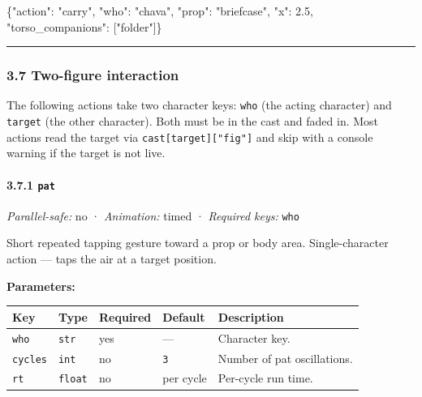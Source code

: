 \documentclass[
  12pt,
  letterpaper,
]{book}
\newenvironment{Shaded}{}{}
\newcommand{\DataTypeTok}[1]{\textcolor[rgb]{0.56,0.13,0.00}{#1}}
\newcommand{\FloatTok}[1]{\textcolor[rgb]{0.25,0.63,0.44}{#1}}
\newcommand{\FunctionTok}[1]{\textcolor[rgb]{0.02,0.16,0.49}{#1}}
\newcommand{\OtherTok}[1]{\textcolor[rgb]{0.00,0.44,0.13}{#1}}
\newcommand{\StringTok}[1]{\textcolor[rgb]{0.25,0.44,0.63}{#1}}
\begin{document}
\begin{Shaded}
\begin{Highlighting}[]
\FunctionTok{\{}\DataTypeTok{"action"}\FunctionTok{:} \StringTok{"carry"}\FunctionTok{,} \DataTypeTok{"who"}\FunctionTok{:} \StringTok{"chava"}\FunctionTok{,} \DataTypeTok{"prop"}\FunctionTok{:} \StringTok{"briefcase"}\FunctionTok{,} \DataTypeTok{"x"}\FunctionTok{:} \FloatTok{2.5}\FunctionTok{,}
 \DataTypeTok{"torso\_companions"}\FunctionTok{:} \OtherTok{[}\StringTok{"folder"}\OtherTok{]}\FunctionTok{\}}
\end{Highlighting}
\end{Shaded}

\begin{center}\rule{0.5\linewidth}{0.5pt}\end{center}

\subsubsection{3.7 Two-figure interaction}\label{two-figure-interaction}

The following actions take two character keys: \texttt{who} (the acting
character) and \texttt{target} (the other character). Both must be in
the cast and faded in. Most actions read the target via
\texttt{cast{[}target{]}{[}"fig"{]}} and skip with a console warning if
the target is not live.

\paragraph{\texorpdfstring{3.7.1 \texttt{pat}}{3.7.1 pat}}\label{pat}

\emph{Parallel-safe:} no · \emph{Animation:} timed · \emph{Required
keys:} \texttt{who}

Short repeated tapping gesture toward a prop or body area.
Single-character action --- taps the air at a target position.

\textbf{Parameters:}

\begin{longtable}[]{@{}lllll@{}}
\toprule\noalign{}
Key & Type & Required & Default & Description \\
\midrule\noalign{}
\endhead
\bottomrule\noalign{}
\endlastfoot
\texttt{who} & \texttt{str} & yes & --- & Character key. \\
\texttt{cycles} & \texttt{int} & no & \texttt{3} & Number of pat
oscillations. \\
\texttt{rt} & \texttt{float} & no & per cycle & Per-cycle run time. \\
\end{longtable}
\end{document}
